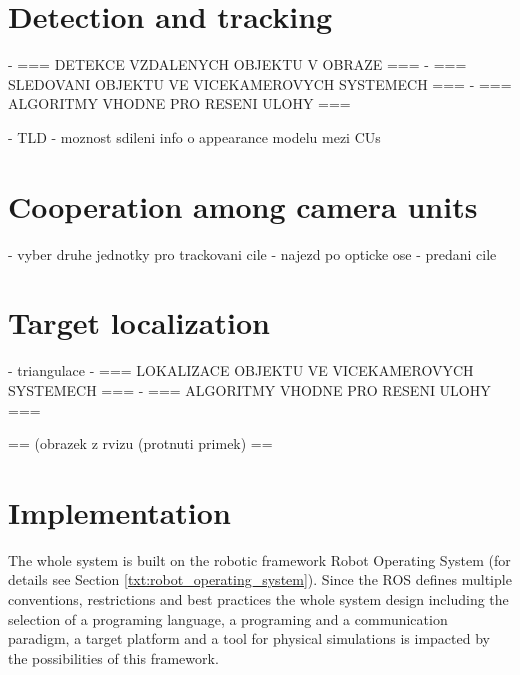 \chapter{Detection and tracking} \label{txt:detection_and_tracking}

- === DETEKCE VZDALENYCH OBJEKTU V OBRAZE ===
- === SLEDOVANI OBJEKTU VE VICEKAMEROVYCH SYSTEMECH ===
- === ALGORITMY VHODNE PRO RESENI ULOHY ===

- TLD
- moznost sdileni info o appearance modelu mezi CUs


\chapter{Cooperation among camera units}

- vyber druhe jednotky pro trackovani cile
- najezd po opticke ose
- predani cile


\chapter{Target localization}

- triangulace
- === LOKALIZACE OBJEKTU VE VICEKAMEROVYCH SYSTEMECH ===
- === ALGORITMY VHODNE PRO RESENI ULOHY ===

== (obrazek z rvizu (protnuti primek) ==



\chapter{Implementation}

The whole system is built on the robotic framework Robot Operating System (for details see Section \ref{txt:robot_operating_system}). Since the ROS defines multiple conventions, restrictions and best practices the whole system design including the selection of a programing language, a programing and a communication paradigm, a target platform and a tool for physical simulations is impacted by the possibilities of this framework.

